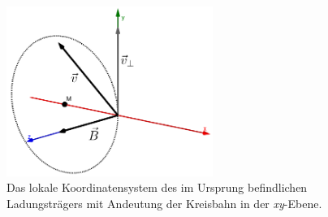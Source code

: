 \begin{figure}
  \label{fig:locale_movement}
  \centering
  \includegraphics[width=0.6\textwidth]{geogebra/img/local_movement_edited}
  \caption{Das lokale Koordinatensystem des im Ursprung befindlichen Ladungstr\"agers mit Andeutung der Kreisbahn in der
    \textit{xy}-Ebene.}
\end{figure}

